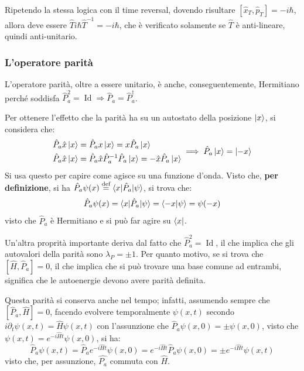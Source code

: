 \documentclass[11pt, a4paper]{scrartcl} %
\numberwithin{equation}{subsection}
\theoremstyle{style2}
\theoremstyle{style1}
\begin{document}
Ripetendo la stessa logica con il time reversal, dovendo risultare $[\hat{x}_T, \hat{p}_T] = - i\hbar $, allora deve essere $\hat{T} i\hbar \hat{T}^{-1} = - i\hbar $, che \`e verificato solamente se $\hat{T}$ \`e anti-lineare, quindi anti-unitario.

\subsubsection{L'operatore parit\`a}

L'operatore parit\`a, oltre a essere unitario, \`e anche, conseguentemente, Hermitiano perch\'e soddisfa $\hat{P}_a^2 = \operatorname{Id} \Rightarrow  \hat{P}_a = \hat{P}_a^\dagger $.

Per ottenere l'effetto che la parit\`a ha su un autostato della posizione $\ket{x} $, si considera che:
\[
\begin{split}
	&\hat{P}_a \hat{x}\ket{x}  = \hat{P}_a x \ket{x}  = x \hat{P}_a \ket{x} \\
	& \hat{P}_a \hat{x} \ket{x}  = \hat{P}_a \hat{x}\hat{P}_a^{-1} \hat{P}_a \ket{x}  = -\hat{x} \hat{P}_a \ket{x} 
\end{split}\implies \hat{P}_a \ket{x}  = \ket{-x}  
\] 
Si usa questo per capire come agisce su una funzione d'onda. 
Visto che, \textbf{per definizione}, si ha $\hat{P}_a \psi (x) \overset{\text{def}}{=} \braket{x|\hat{P}_a|\psi} $, si trova che:
\[
\hat{P}_a \psi (x) = \braket{x|\hat{P}_a|\psi } = \braket{-x|\psi } = \psi (-x)
\] 
visto che $\hat{P}_a$ \`e Hermitiano e si pu\`o far agire su $\bra{x} $.

Un'altra proprit\`a importante deriva dal fatto che $\hat{P}_a ^2 = \operatorname{Id} $, il che implica che gli autovalori della parit\`a sono $\lambda _P = \pm 1$.
Per quanto motivo, se si trova che $[\hat{H},\hat{P}_a] = 0$, il che implica che si pu\`o trovare una base comune ad entrambi, significa che le autoenergie devono avere parit\`a definita.

Questa parit\`a si conserva anche nel tempo; infatti, assumendo sempre che $[\hat{P}_a, \hat{H}] = 0$, facendo evolvere temporalmente $\psi (x,t) $ secondo $i \partial _t \psi (x,t) = \hat{H} \psi (x,t)$ con l'assunzione che $\hat{P}_a \psi (x,0) = \pm \psi (x,0)$, visto che $\psi (x,t) = e ^{- i \hat{H} t} \psi (x,0)$, si ha:
\[
\hat{P}_a \psi (x,t) = \hat{P}_a e^{- i \hat{H}  t} \psi (x,0) = e ^{- i \hat{H} t}  \hat{P}_a \psi (x,0) =\pm e^{ - i \hat{H} t} \psi (x,t)
\] 
visto che, per assunzione, $\hat{P_a}$ commuta con $\hat{H}$.
\end{document}
